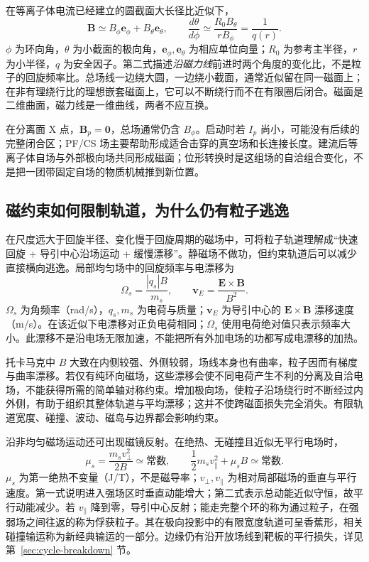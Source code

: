 \documentclass[12pt,fontset=none]{ctexart}
\numberwithin{equation}{section}
\numberwithin{table}{section}
\numberwithin{figure}{section}
\begin{document}
在等离子体电流已经建立的圆截面大长径比近似下，
\begin{equation}\label{eq:micro-pitch}
 \bm B\simeq B_\phi\bm e_\phi+B_\theta\bm e_\theta,\qquad
 \frac{d\theta}{d\phi}\simeq\frac{R_0B_\theta}{rB_\phi}=\frac1{q(r)}.
\end{equation}
$\phi$ 为环向角，$\theta$ 为小截面的极向角，$\bm e_\phi,\bm e_\theta$ 为相应单位向量；$R_0$ 为参考主半径，$r$ 为小半径，$q$ 为安全因子。第二式描述\emph{沿磁力线}前进时两个角度的变化比，不是粒子的回旋频率比。总场线一边绕大圆，一边绕小截面，通常近似留在同一磁面上；在非有理绕行比的理想嵌套磁面上，它可以不断绕行而不在有限圈后闭合。磁面是二维曲面，磁力线是一维曲线，两者不应互换。

在分离面 X 点，$\bm B_p=\bm0$，总场通常仍含 $B_\phi$。启动时若 $I_p$ 尚小，可能没有后续的完整闭合区；PF/CS 场主要帮助形成适合击穿的真空场和长连接长度。建流后等离子体自场与外部极向场共同形成磁面；位形转换时是这组场的自洽组合变化，不是把一团带固定自场的物质机械推到新位置。

\subsection{磁约束如何限制轨道，为什么仍有粒子逃逸}\label{sec:micro-orbits}

在尺度远大于回旋半径、变化慢于回旋周期的磁场中，可将粒子轨道理解成``快速回旋 + 导引中心沿场运动 + 缓慢漂移''。静磁场不做功，但约束轨道后可以减少直接横向逃逸。局部均匀场中的回旋频率与电漂移为
\begin{equation}\label{eq:micro-drifts}
 \Omega_s=\frac{|q_s|B}{m_s},\qquad
 \bm v_E=\frac{\bm E\times\bm B}{B^2}.
\end{equation}
$\Omega_s$ 为角频率（rad/s），$q_s,m_s$ 为电荷与质量；$\bm v_E$ 为导引中心的 $\bm E\times\bm B$ 漂移速度（m/s）。在该近似下电漂移对正负电荷相同；$\Omega_s$ 使用电荷绝对值只表示频率大小。此漂移不是沿电场无限加速，不能把所有外加电场的功都写成电漂移的加热\cite{Porbits}。

托卡马克中 $B$ 大致在内侧较强、外侧较弱，场线本身也有曲率，粒子因而有梯度与曲率漂移。若仅有纯环向磁场，这些漂移会使不同电荷产生不利的分离及自洽电场，不能获得所需的简单轴对称约束。增加极向场，使粒子沿场绕行时不断经过内外侧，有助于组织其整体轨道与平均漂移；这并不使跨磁面损失完全消失。有限轨道宽度、碰撞、波动、磁岛与边界都会影响约束。

沿非均匀磁场运动还可出现磁镜反射。在绝热、无碰撞且近似无平行电场时，
\begin{equation}\label{eq:micro-mirror}
 \mu_s=\frac{m_sv_\perp^2}{2B}\simeq\text{常数},\qquad
 \frac12m_sv_\parallel^2+\mu_s B\simeq\text{常数}.
\end{equation}
$\mu_s$ 为第一绝热不变量（J/T），不是磁导率；$v_\perp,v_\parallel$ 为相对局部磁场的垂直与平行速度。第一式说明进入强场区时垂直动能增大；第二式表示总动能近似守恒，故平行动能减少。若 $v_\parallel$ 降到零，导引中心反射；能走完整个环的称为通过粒子，在强弱场之间往返的称为俘获粒子。其在极向投影中的有限宽度轨道可呈香蕉形，相关碰撞输运称为新经典输运的一部分。边缘仍有沿开放场线到靶板的平行损失，详见第~\ref{sec:cycle-breakdown} 节。
\end{document}
